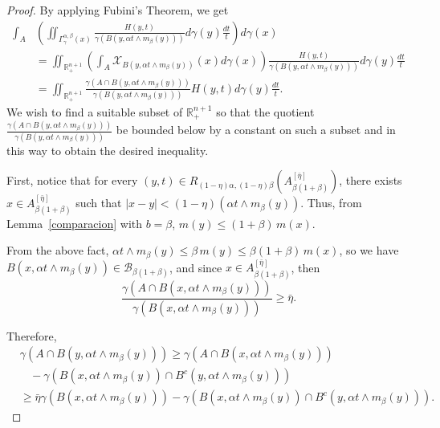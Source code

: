 \documentclass[10pt,a4paper]{amsart}
\begin{document}
\begin{proof}
By applying Fubini's Theorem, we get
\begin{align*}
    \int_A &\left(\iint_{\Gamma_\gamma^{\alpha, \beta}(x)} \frac{H(y,t)}{\gamma(B(y,\alpha t\wedge m_\beta(y)))} d\gamma(y) \frac{dt}{t}\right) d\gamma(x) \\
    &= \iint_{\mathbb R^{n+1}_+} \left(\int_A \mathcal{X}_{B(y,\alpha t\wedge m_\beta (y))}(x) d\gamma(x)\right)  \frac{H(y,t)}{\gamma(B(y,\alpha t\wedge m_\beta(y)))} d\gamma(y) \frac{dt}{t}\\
    &= \iint_{\mathbb R^{n+1}_+} \frac{\gamma(A\cap B(y,\alpha t\wedge m_\beta (y)))}{\gamma(B(y,\alpha t\wedge m_\beta (y)))} H(y,t) d\gamma(y) \frac{dt}{t}.
\end{align*}
We wish to find a suitable subset of ${\mathbb R}^{n+1}_+$ so that the quotient $\frac{\gamma(A\cap B(y,\alpha t\wedge m_\beta(y)))}{\gamma(B(y,\alpha t\wedge m_\beta(y)))}$ be bounded below by a constant on such a subset and  in this way to obtain the desired inequality.

First, notice that for every $(y,t)\in R_{(1-\eta)\alpha, (1-\eta)\beta}\left(A^{[\bar{\eta}]}_{\beta (1+\beta)}\right)$, there exists $x\in A^{[\bar{\eta}]}_{\beta(1+\beta)}$ such that ${|x-y|<(1-\eta)(\alpha t\wedge m_\beta(y))}$. Thus, from Lemma~\ref{comparacion} with $b=\beta$, $ m(y)\leq (1+\beta)\, m(x)$. 

From the above fact, $\alpha t\wedge m_\beta(y) \leq \beta\,  m(y)\leq \beta (1+\beta)\,  m(x)$, so we have $B(x,\alpha t\wedge m_\beta(y))\in \mathscr{B}_{\beta (1+\beta)}$, and since $x\in A^{[\bar{\eta}]}_{\beta (1+\beta)}$, then 
\[\frac{\gamma(A\cap B(x,\alpha t\wedge m_\beta(y)))}{\gamma(B(x,\alpha t\wedge m_\beta(y)))}\geq \bar{\eta}.\]

Therefore,
\begin{align*}
  &\gamma(A\cap B(y,\alpha t\wedge m_\beta(y)))\geq \gamma(A\cap B(x,\alpha t\wedge m_\beta(y)))\\ &\ \ \ \ -\gamma(B(x,\alpha t\wedge m_\beta(y))\cap B^c(y,\alpha t\wedge m_\beta(y)))\\
  &\geq \bar{\eta} \gamma(B(x,\alpha t\wedge m_\beta(y)))-\gamma(B(x,\alpha t\wedge m_\beta(y))\cap B^c(y,\alpha t\wedge m_\beta(y))).
\end{align*}


\end{proof}
\end{document}
